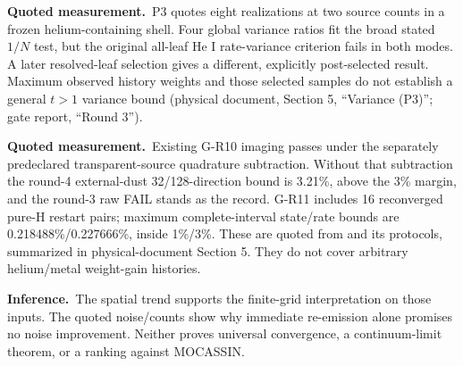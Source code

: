 \documentclass[english,a4paper]{my_memo}
\newcommand{\Measured}{\noindent\textbf{Quoted measurement.}\ }
\newcommand{\Inferred}{\noindent\textbf{Inference.}\ }
\begin{document}
\Measured P3 quotes eight realizations at two source counts in a frozen
helium-containing shell. Four global variance ratios fit the broad
stated $1/N$ test, but the original all-leaf He I rate-variance criterion
fails in both modes. A later resolved-leaf selection gives a different,
explicitly post-selected result. Maximum observed history weights and
those selected samples do not establish a general $t>1$ variance bound
(physical document, Section 5, ``Variance (P3)''; gate report, ``Round 3'').

\Measured Existing G-R10 imaging passes under the separately predeclared
transparent-source quadrature subtraction. Without that subtraction the
round-4 external-dust 32/128-direction bound is 3.21\%, above the 3\%
margin, and the round-3 raw FAIL stands as the record. G-R11 includes 16
reconverged pure-H restart pairs; maximum complete-interval state/rate
bounds are 0.218488\%/0.227666\%, inside 1\%/3\%. These are quoted from
 and its protocols,
summarized in physical-document Section 5. They do not cover arbitrary
helium/metal weight-gain histories.

\Inferred The spatial trend supports the finite-grid interpretation on
those inputs. The quoted noise/counts show why immediate re-emission
alone promises no noise improvement. Neither proves universal
convergence, a continuum-limit theorem, or a ranking against MOCASSIN.
\end{document}
